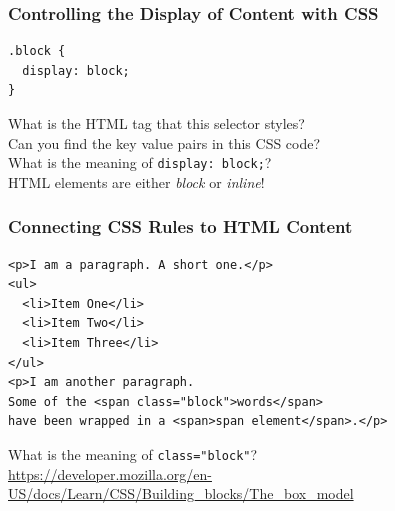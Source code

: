 \documentclass[14pt,aspectratio=169]{beamer}
\begin{document}
%
\begin{frame}[fragile]
  \frametitle{Controlling the Display of Content with CSS}
  \normalsize
  \hspace*{.25in}
  \begin{minipage}{6in}
    \vspace*{.2in}
    \begin{verbatim}
.block {
  display: block;
}
    \end{verbatim}
  \end{minipage}
  \vspace*{.05in}
  \begin{center}
    \noindent What is the HTML tag that this selector styles? \\
    \noindent Can you find the key value pairs in this CSS code? \\
    \noindent What is the meaning of {\tt display: block;}? \\
    \noindent HTML elements are either {\em block} or {\em inline}! \\
  \end{center}
\end{frame}

%
\begin{frame}[fragile]
  \frametitle{Connecting CSS Rules to HTML Content}
  \normalsize
  \hspace*{.15in}
  \begin{minipage}{6in}
    \vspace*{.2in}
    \begin{verbatim}
<p>I am a paragraph. A short one.</p>
<ul>
  <li>Item One</li>
  <li>Item Two</li>
  <li>Item Three</li>
</ul>
<p>I am another paragraph.
Some of the <span class="block">words</span>
have been wrapped in a <span>span element</span>.</p>
    \end{verbatim}
  \end{minipage}
  \vspace*{.05in}
  \begin{center}
    \noindent What is the meaning of {\tt class="block"}? \\
    \noindent  \url{https://developer.mozilla.org/en-US/docs/Learn/CSS/Building_blocks/The_box_model}
  \end{center}
\end{frame}
\end{document}
